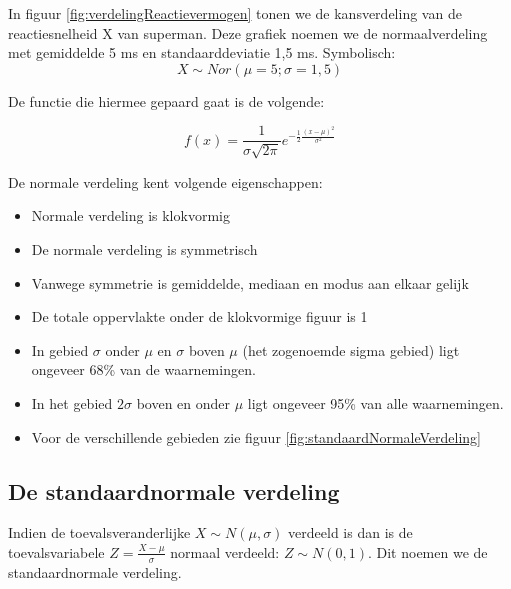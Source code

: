 {In figuur \ref{fig:verdelingReactievermogen} tonen we de kansverdeling van de reactiesnelheid X van superman. Deze grafiek noemen we de normaalverdeling met gemiddelde 5 ms en standaarddeviatie 1,5 ms. Symbolisch:
\[ X  \sim Nor(\mu = 5; \sigma = 1,5) \]

De functie die hiermee gepaard gaat is de volgende:

\begin{equation}
  f(x) = \frac{1}{\sigma \sqrt{2\pi}} e^{-\frac{1}{2} \frac{(x - \mu)^{2}}{\sigma^{2}}}
  \label{eq:normalFunction}
\end{equation}

De normale verdeling kent volgende eigenschappen:
\begin{itemize}
  \item Normale verdeling is klokvormig
  \item De normale verdeling is symmetrisch
  \item Vanwege symmetrie is gemiddelde, mediaan en modus aan elkaar gelijk
  \item De totale oppervlakte onder de klokvormige figuur is 1
  \item In gebied $\sigma$ onder $\mu$ en $\sigma$ boven $\mu$ (het zogenoemde sigma gebied) ligt ongeveer 68\% van de waarnemingen.
  \item In het gebied $2\sigma$ boven en onder $\mu$ ligt ongeveer 95\% van alle waarnemingen.
  \item Voor de verschillende gebieden zie figuur \ref{fig:standaardNormaleVerdeling}
\end{itemize}

\subsection{De standaardnormale verdeling}

Indien de toevalsveranderlijke $X \sim N(\mu,\sigma)$ verdeeld is dan is de toevalsvariabele $Z = \frac{X - \mu}{\sigma}$ normaal verdeeld: $Z \sim N(0,1)$. Dit noemen we de standaardnormale verdeling.

}
